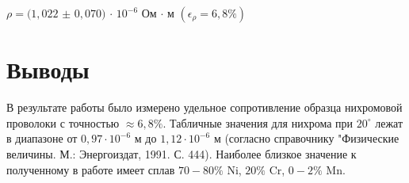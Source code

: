 \documentclass[a4paper]{article}
\begin{document}
$\rho = (1,022$ $\pm$ $0,070)$ $\cdot$ $10^{-6}$ Ом $\cdot$ м $(\epsilon_\rho = 6,8 \%)$

\section{Выводы}
В результате работы было измерено удельное сопротивление образца нихромовой проволоки с точностью $\approx 6,8 \%$. Табличные значения для нихрома при $20^{\circ}$ лежат в диапазоне от $0,97 \cdot 10^{-6}$ м до $1,12 \cdot 10^{-6}$ м (согласно справочнику "Физические величины. М.: Энергоиздат, 1991. С. 444). Наиболее близкое значение к полученному в работе имеет сплав $70-80\%$ Ni, $ 20\%$ Cr, $0-2\%$ Mn.
\end{document}
